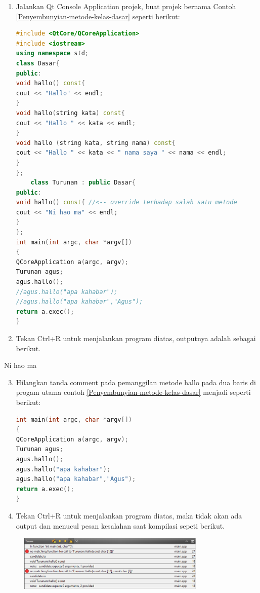 \begin{enumerate}

\item
  Jalankan Qt Console Application projek, buat projek bernama Contoh \ref{Penyembunyian-metode-kelas-dasar}
  seperti berikut:

\begin{lstlisting}[language=c++, caption=Penyembunyian metode kelas dasar, label=Penyembunyian-metode-kelas-dasar]
#include <QtCore/QCoreApplication>
#include <iostream>
using namespace std;
class Dasar{
public:
void hallo() const{
cout << "Hallo" << endl;
}
void hallo(string kata) const{
cout << "Hallo " << kata << endl;
}
void hallo (string kata, string nama) const{
cout << "Hallo " << kata << " nama saya " << nama << endl;
}
};
    class Turunan : public Dasar{
public:
void hallo() const{ //<-- override terhadap salah satu metode
cout << "Ni hao ma" << endl;
}
};
int main(int argc, char *argv[])
{
QCoreApplication a(argc, argv);
Turunan agus;
agus.hallo();
//agus.hallo("apa kahabar");
//agus.hallo("apa kahabar","Agus");
return a.exec();
}
\end{lstlisting}
\item
  Tekan Ctrl+R untuk menjalankan program diatas, outputnya adalah
  sebagai berikut.
\end{enumerate}

\begin{lcverbatim}
 Ni hao ma
\end{lcverbatim}

\begin{enumerate}

\setcounter{enumi}{2}
\item
  Hilangkan tanda comment pada pemanggilan metode hallo pada dua baris
  di progam utama contoh \ref{Penyembunyian-metode-kelas-dasar} menjadi seperti berikut:

\begin{lstlisting}[language=c++, caption=Menghilangkan comment pada metode hallo]
int main(int argc, char *argv[])
{
QCoreApplication a(argc, argv);
Turunan agus;
agus.hallo();
agus.hallo("apa kahabar");
agus.hallo("apa kahabar","Agus");
return a.exec();
}
\end{lstlisting}
\item
  Tekan Ctrl+R untuk menjalankan program diatas, maka tidak akan ada
  output dan menucul pesan kesalahan saat kompilasi sepeti berikut.
\end{enumerate}

\begin{figure}[htbp]
\centering
\includegraphics[width=0.8\textwidth]{images/capture7-5.png}

\end{figure}

